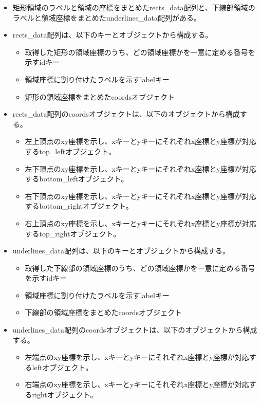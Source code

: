 \begin{itemize}
    \item 矩形領域のラベルと領域の座標をまとめたrects\_data配列と、下線部領域のラベルと領域座標をまとめたunderlines\_data配列がある。
    \item rects\_data配列は、以下のキーとオブジェクトから構成する。
        \begin{itemize}
            \item 取得した矩形の領域座標のうち、どの領域座標かを一意に定める番号を示すidキー
            \item 領域座標に割り付けたラベルを示すlabelキー
            \item 矩形の領域座標をまとめたcoordsオブジェクト
        \end{itemize}
    \item rects\_data配列のcoordsオブジェクトは、以下のオブジェクトから構成する。
        \begin{itemize}
            \item 左上頂点のxy座標を示し、xキーとyキーにそれぞれx座標とy座標が対応するtop\_leftオブジェクト。
            \item 左下頂点のxy座標を示し、xキーとyキーにそれぞれx座標とy座標が対応するbottom\_leftオブジェクト。
            \item 右下頂点のxy座標を示し、xキーとyキーにそれぞれx座標とy座標が対応するbottom\_rightオブジェクト。
            \item 右上頂点のxy座標を示し、xキーとyキーにそれぞれx座標とy座標が対応するtop\_rightオブジェクト。
        \end{itemize}
    \item underlines\_data配列は、以下のキーとオブジェクトから構成する。
        \begin{itemize}
            \item 取得した下線部の領域座標のうち、どの領域座標かを一意に定める番号を示すidキー
            \item 領域座標に割り付けたラベルを示すlabelキー
            \item 下線部の領域座標をまとめたcoordsオブジェクト
        \end{itemize}
    \item underlines\_data配列のcoordsオブジェクトは、以下のオブジェクトから構成する。
    \begin{itemize}
        \item 左端点のxy座標を示し、xキーとyキーにそれぞれx座標とy座標が対応するleftオブジェクト。
        \item 右端点のxy座標を示し、xキーとyキーにそれぞれx座標とy座標が対応するrightオブジェクト。
    \end{itemize}
\end{itemize}


